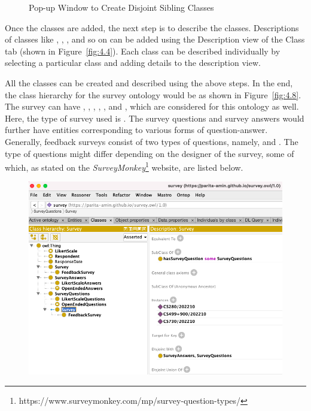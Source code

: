 \begin{doublespace}
\begin{enumerate}
\begin{figure}[htp]
    \caption{Pop-up Window to Create Disjoint Sibling Classes}
    \label{fig:4.7}
\end{figure}
\end{enumerate}
\par Once the classes are added, the next step is to describe the classes. Descriptions of classes like , , ,  and so on can be added using the Description view of the Class tab (shown in Figure~\ref{fig:4.4}). Each class can be described individually by selecting a particular class and adding details to the description view. 
\par All the classes can be created and described using the above steps. In the end, the class hierarchy for the survey ontology would be as shown in Figure~\ref{fig:4.8}. The survey can have , , , , , and , which are considered for this ontology as well. Here, the type of survey used is . The survey questions and survey answers would further have entities corresponding to various forms of question-answer. Generally, feedback surveys consist of two types of questions, namely,  and . The type of questions might differ depending on the designer of the survey, some of which, as stated on the \emph{SurveyMonkey}\footnote{https://www.surveymonkey.com/mp/survey-question-types/} website, are listed below. 
\begin{figure}[htp]
    \centering
    \includegraphics[width=15cm]{images/ch4/Figure8.png}

\end{figure}
\end{doublespace}
